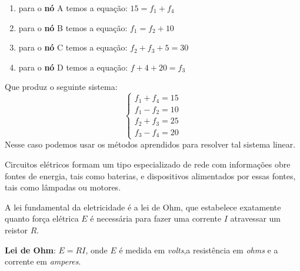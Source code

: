 \documentclass{beamer}
\begin{document}
    \begin{frame}
        \begin{enumerate}[label={\roman*})]
            \item para o \textbf{nó} A temos a equação: $15 = f_1 + f_4$
            \item para o \textbf{nó} B temos a equação: $f_1 = f_2 + 10$
            \item para o \textbf{nó} C temos a equação: $f_2 + f_3 + 5 = 30$
            \item para o \textbf{nó} D temos a equação: $f+4 + 20 = f_3$
        \end{enumerate}
    \end{frame}

    \begin{frame}
        Que produz o seguinte sistema:
        \[
            \begin{cases}
                f_1 + f_4 = 15\\
                f_1 - f_2 = 10\\
                f_2 + f_3 = 25\\
                f_3 - f_4 = 20
            \end{cases}
        \]
        Nesse caso podemos usar os métodos aprendidos para resolver tal sistema linear.
    \end{frame}

    \begin{frame}
        Circuitos elétricos formam um tipo especializado de rede com informações obre fontes de energia, tais como baterias, e dispositivos alimentados por essas fontes, tais como lâmpadas ou motores.

        A lei fundamental da eletricidade é a lei de Ohm, que estabelece exatamente quanto força elétrica $E$ é necessária para fazer uma corrente $I$ atravessar um reistor $R$.

        \textbf{Lei de Ohm}: $ E = RI$, 
            onde $E$ é medida em \textit{volts},a resistência em \textit{ohms} e a corrente em \textit{amperes}.
    \end{frame}
\end{document}
